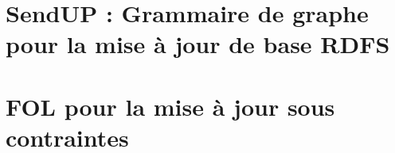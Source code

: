 

\section{SendUP : Grammaire de graphe pour la mise à jour de base RDFS}
\label{sec:update:soa:sendup}


\section{FOL pour la mise à jour sous contraintes}
\label{sec:update:soa:updchase}

